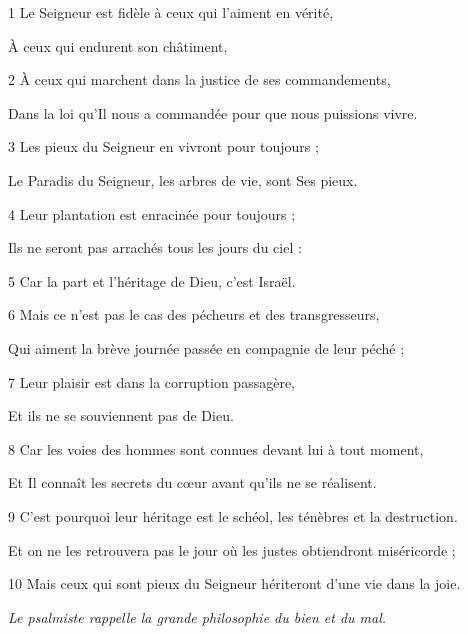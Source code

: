\par 1 Le Seigneur est fidèle à ceux qui l'aiment en vérité,
\par     À ceux qui endurent son châtiment,
\par 2 À ceux qui marchent dans la justice de ses commandements,
\par     Dans la loi qu'Il nous a commandée pour que nous puissions vivre.
\par 3 Les pieux du Seigneur en vivront pour toujours ;
\par     Le Paradis du Seigneur, les arbres de vie, sont Ses pieux.
\par 4 Leur plantation est enracinée pour toujours ;
\par     Ils ne seront pas arrachés tous les jours du ciel :
\par 5 Car la part et l'héritage de Dieu, c'est Israël.
\par 6 Mais ce n'est pas le cas des pécheurs et des transgresseurs,
\par     Qui aiment la brève journée passée en compagnie de leur péché ;
\par 7 Leur plaisir est dans la corruption passagère,
\par     Et ils ne se souviennent pas de Dieu.
\par 8 Car les voies des hommes sont connues devant lui à tout moment,
\par     Et Il connaît les secrets du cœur avant qu’ils ne se réalisent.
\par 9 C'est pourquoi leur héritage est le schéol, les ténèbres et la destruction.
\par     Et on ne les retrouvera pas le jour où les justes obtiendront miséricorde ;
\par 10 Mais ceux qui sont pieux du Seigneur hériteront d'une vie dans la joie.


\par \textit{Le psalmiste rappelle la grande philosophie du bien et du mal.}

